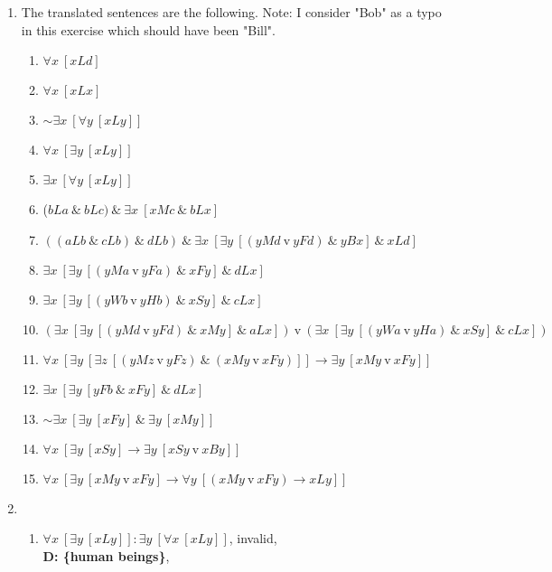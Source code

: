 \documentclass[a4paper,12pt]{article}
\newcommand{\ra}{\rightarrow}
\newcommand{\s}{\sim}
\newcommand{\tv}{ \ \textrm{v} \ }
\newcommand{\ta}{ \ \& \ }
\newcommand{\all}{\forall}
\newcommand{\ex}{\exists}
\begin{document}
    \begin{enumerate}[label=\arabic*,leftmargin=*]
        \item The translated sentences are the following. Note: I consider "Bob" as a typo in this exercise which should have been "Bill".
            \begin{enumerate}[label=(\roman*)]
                \item $\all x \ [xLd]$
                \item $\all x \ [xLx]$
                \item $\s \ex x \ [\all y \ [xLy]]$
                \item $\all x \ [\ex y \ [xLy]]$
                \item $\ex x \ [\all y \ [xLy]]$
                \item ($bLa \ta bLc) \ta \ex x \ [xMc \ta bLx]$
                \item $((aLb \ta cLb) \ta dLb) \ta
                    \ex x \ [\ex y \ [(yMd \tv yFd) \ta yBx] \ta xLd]$
                \item $\ex x \ [\ex y \ [(yMa \tv yFa) \ta xFy] \ta dLx]$
                \item $\ex x \ [\ex y \ [(yWb \tv yHb) \ta xSy] \ta cLx]$
                \item $(\ex x \ [\ex y \ [(yMd \tv yFd) \ta xMy] \ta aLx])
                    \tv (\ex x \ [\ex y \ [(yWa \tv yHa) \ta xSy] \ta cLx])$
                \item $\all x \ [\ex y \ [\ex z \ [(yMz \tv yFz) \ta (xMy \tv xFy)]] \ra \ex y \ [xMy \tv xFy]]$
                \item $\ex x \ [\ex y \ [yFb \ta xFy] \ta dLx]$
                \item $\s \ex x \ [\ex y \ [xFy] \ta \ex y \ [xMy]]$
                \item $\all x \ [\ex y \ [xSy] \ra \ex y \ [xSy \tv xBy]]$
                \item $\all x \ [\ex y \ [xMy \tv xFy]
                    \ra \all y \ [(xMy \tv xFy) \ra xLy]]$
            \end{enumerate}
        \item
            \begin{enumerate}[label=(\roman*)]
                \item $\all x \ [\ex y \ [xLy]]
                    : \ex y \ [\all x \ [xLy]]$,
                    invalid,\\
                    \textbf{D: \{human beings\}},\\

\end{enumerate}
\end{enumerate}
\end{document}
